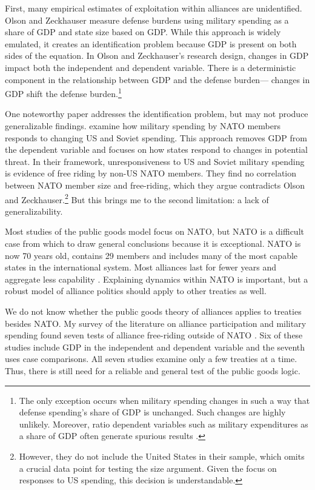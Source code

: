 \documentclass[12pt]{article}
\begin{document}
First, many empirical estimates of exploitation within alliances are unidentified.
Olson and Zeckhauser measure defense burdens using military spending as a share of GDP and state size based on GDP.
While this approach is widely emulated, it creates an identification problem because GDP is present on both sides of the equation.
In Olson and Zeckhauser's research design, changes in GDP impact both the independent and dependent variable. 
There is a deterministic component in the relationship between GDP and the defense burden--- changes in GDP shift the defense burden.\footnote{
The only exception occurs when military spending changes in such a way that defense spending's share of GDP is unchanged. Such changes are highly unlikely. Moreover, ratio dependent variables such as military expenditures as a share of GDP often generate spurious results \citep{Kronmal1993}.}  
 

One noteworthy paper addresses the identification problem, but may not produce generalizable findings. 
\citet{PluemperNeumayer2015} examine how military spending by NATO members responds to changing US and Soviet spending.
This approach removes GDP from the dependent variable and focuses on how states respond to changes in potential threat.  
In their framework, unresponsiveness to US and Soviet military spending is evidence of free riding by non-US NATO members.
They find no correlation between NATO member size and free-riding, which they argue contradicts Olson and Zeckhauser.\footnote{
However, they do not include the United States in their sample, which omits a crucial data point for testing the size argument. Given the focus on responses to US spending, this decision is understandable.}
But this brings me to the second limitation: a lack of generalizability. 


Most studies of the public goods model focus on NATO, but NATO is a difficult case from which to draw general conclusions because it is exceptional. 
NATO is now 70 years old, contains 29 members and includes many of the most capable states in the international system. 
Most alliances last for fewer years and aggregate less capability \citep{Leedsetal2002}. 
Explaining dynamics within NATO is important, but a robust model of alliance politics should apply to other treaties as well. 


We do not know whether the public goods theory of alliances applies to treaties besides NATO. 
My survey of the literature on alliance participation and military spending found seven tests of alliance free-riding outside of NATO \citep{Russett1970, Starr1974, Reisinger1983, Thies1987, ConybeareSandler1990, OnealWhatley1996, Siroky2012}. 
Six of these studies include GDP in the independent and dependent variable and the seventh uses case comparisons.
All seven studies examine only a few treaties at a time. 
Thus, there is still need for a reliable and general test of the public goods logic. 
\end{document}
